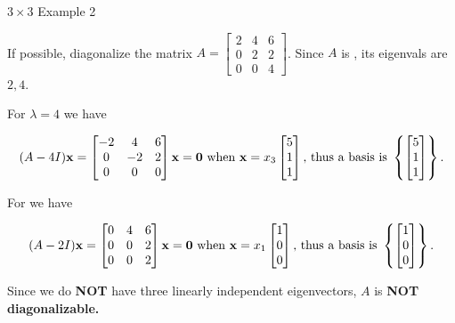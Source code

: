 \documentclass[xcolor=dvipsnames,aspectratio=169,t]{beamer}
\begin{document}
\begin{frame}{$3 \times 3$ Example 2}
  \medskip

  If possible, diagonalize the matrix $A = \begin{bmatrix} 2 & 4 & 6 \\ 0 & 2 & 2 \\ 0 & 0 & 4 \end{bmatrix}$.
  \pause Since $A$ is , its eigenvals are $2,4$.
  
  \vspace{-0.05in}

  \pause
  For \alert{$\lambda =4$} we have

  \[ (A-4I)\mathbf{x} = \begin{bmatrix} -2 & 4 & 6 \\ 0 & - 2 & 2 \\ 0 & 0 & 0 \end{bmatrix} \mathbf{x} = \mathbf{0} \mbox{ when } \mathbf{x} =x_3 \begin{bmatrix} 5 \\ 1 \\ 1 \end{bmatrix} 
  \mbox{, thus a basis is } \left\{ \begin{bmatrix} 5 \\ 1 \\ 1 \end{bmatrix} \right\}.\]
  
  \vspace{-0.05in}

  \pause
  For  we have

  \[ (A-2I)\mathbf{x} = \begin{bmatrix} 0 & 4 & 6 \\ 0 & 0 & 2 \\ 0 & 0 & 2 \end{bmatrix} \mathbf{x} = \mathbf{0} \mbox{ when } \mathbf{x} =x_1 \begin{bmatrix} 1 \\ 0 \\ 0 \end{bmatrix} \mbox{, thus a basis is } \left\{ \begin{bmatrix} 1 \\ 0 \\ 0 \end{bmatrix} \right\} .\]
  \smallskip

  \pause
  Since we do \alert{\textbf{NOT}} have three linearly independent eigenvectors, $A$ is \alert{\textbf{NOT diagonalizable.}}
\end{frame}
\end{document}
